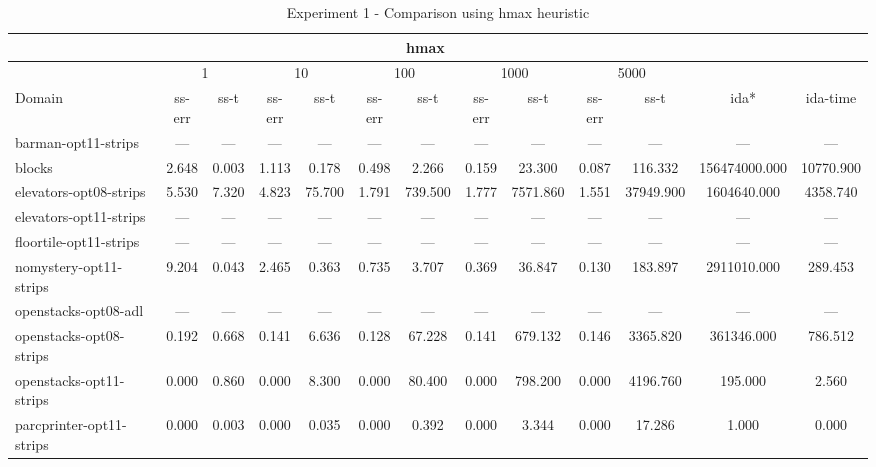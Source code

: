 \documentclass[a4paper,12pt]{article}
\begin{document}
\begin{table}[]
\footnotesize\setlength{\tabcolsep}{1.8pt}
\caption{Experiment 1 - Comparison using hmax heuristic}
\label{my-label}
\begin{tabular}{l@{\hspace{6pt}} *{12}{c}}
\hline
	                                                & \multicolumn{10}{c}{hmax}                                                                                                          & \multicolumn{2}{l}{}      \\ \hline

                  & \multicolumn{2}{c|}{1} & \multicolumn{2}{c|}{10} & \multicolumn{2}{c|}{100} & \multicolumn{2}{c|}{1000} & \multicolumn{2}{c|}{5000}                   \\ \hline  
Domain                  & ss-err  & ss-t  & ss-err  & ss-t  & ss-err  & ss-t  & ss-err  & ss-t  & ss-err  & ss-t  & ida*  & ida-time  \\ \hline
barman-opt11-strips     & --- & --- & --- & --- & --- & --- & --- & --- & --- & --- & --- & --- \\ \hline
blocks                  & 2.648 & 0.003 & 1.113 & 0.178 & 0.498 & 2.266 & 0.159 & 23.300 & 0.087 & 116.332 & 156474000.000 & 10770.900 \\ \hline
elevators-opt08-strips  & 5.530 & 7.320 & 4.823 & 75.700 & 1.791 & 739.500 & 1.777 & 7571.860 & 1.551 & 37949.900 & 1604640.000 & 4358.740 \\ \hline
elevators-opt11-strips  & --- & --- & --- & --- & --- & --- & --- & --- & --- & --- & --- & --- \\ \hline
floortile-opt11-strips  & --- & --- & --- & --- & --- & --- & --- & --- & --- & --- & --- & --- \\ \hline
nomystery-opt11-strips  & 9.204 & 0.043 & 2.465 & 0.363 & 0.735 & 3.707 & 0.369 & 36.847 & 0.130 & 183.897 & 2911010.000 & 289.453 \\ \hline
openstacks-opt08-adl    & --- & --- & --- & --- & --- & --- & --- & --- & --- & --- & --- & --- \\ \hline
openstacks-opt08-strips & 0.192 & 0.668 & 0.141 & 6.636 & 0.128 & 67.228 & 0.141 & 679.132 & 0.146 & 3365.820 & 361346.000 & 786.512 \\ \hline
openstacks-opt11-strips & 0.000 & 0.860 & 0.000 & 8.300 & 0.000 & 80.400 & 0.000 & 798.200 & 0.000 & 4196.760 & 195.000 & 2.560 \\ \hline
parcprinter-opt11-strips& 0.000 & 0.003 & 0.000 & 0.035 & 0.000 & 0.392 & 0.000 & 3.344 & 0.000 & 17.286 & 1.000 & 0.000 \\ \hline

\end{tabular}
\end{table}
\end{document}
